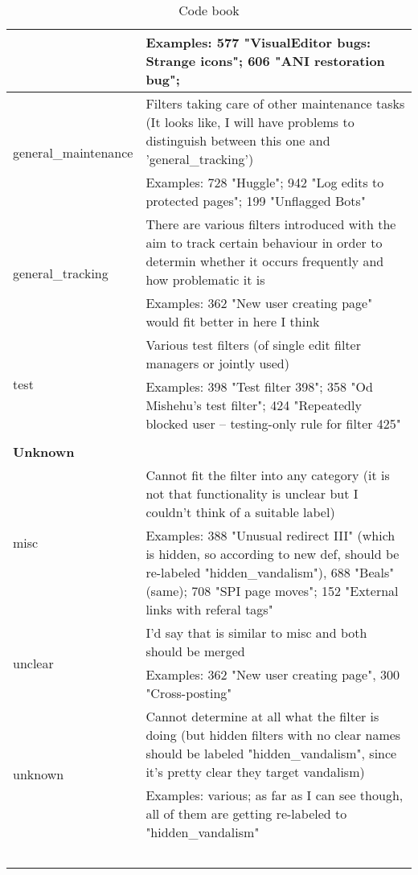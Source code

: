 \begin{longtable}{ | p{5cm} | p{9cm} | }
                                     & Examples: 577 "VisualEditor bugs: Strange icons"; 606 "ANI restoration bug";\\
    \hline
    \multirow{2}{*}{general\_maintenance} & Filters taking care of other maintenance tasks (It looks like, I will have problems to distinguish between this one and 'general\_tracking')\\
                                     & Examples: 728 "Huggle"; 942 "Log edits to protected pages"; 199 "Unflagged Bots"\\
    \hline
    \multirow{2}{*}{general\_tracking} & There are various filters introduced with the aim to track certain behaviour in order to determin whether it occurs frequently and how problematic it is\\
                                     & Examples: 362 "New user creating page" would fit better in here I think\\
    \hline
    \multirow{2}{*}{test} & Various test filters (of single edit filter managers or jointly used)\\
                                     & Examples: 398 "Test filter 398"; 358 "Od Mishehu's test filter"; 424 "Repeatedly blocked user --  testing-only rule for filter 425"\\
    \hline \hline
        \multicolumn{2}{|l|}{} \\
    \hline \hline
        \multicolumn{2}{|l|}{\textbf{Unknown}} \\
    \hline
    \multirow{2}{*}{misc} & Cannot fit the filter into any category (it is not that functionality is unclear but I couldn't think of a suitable label)\\
                                     & Examples: 388 "Unusual redirect III" (which is hidden, so according to new def, should be re-labeled "hidden\_vandalism"), 688 "Beals" (same); 708 "SPI page moves"; 152 "External links with referal tags"\\
    \hline
    \multirow{2}{*}{unclear} & I'd say that is similar to misc and both should be merged\\
                                     & Examples: 362 "New user creating page", 300 "Cross-posting"\\
    \hline
    \multirow{2}{*}{unknown} & Cannot determine at all what the filter is doing (but hidden filters with no clear names should be labeled "hidden\_vandalism", since it's pretty clear they target vandalism)\\
                                     & Examples: various; as far as I can see though, all of them are getting re-labeled to "hidden\_vandalism"\\
    \hline
    \caption{Code book}~\label{table:code-book}
\end{longtable}


